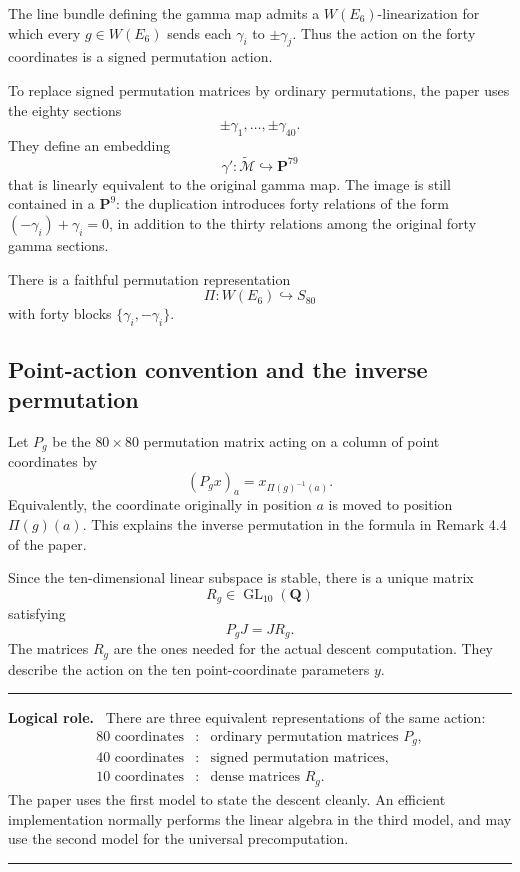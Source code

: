 \documentclass[11pt]{article}
\newcommand{\QQ}{\mathbf{Q}}
\newcommand{\PP}{\mathbf{P}}
\newcommand{\tcM}{\widetilde{\mathcal{M}}}
\newenvironment{roadmap}{%
  \begin{center}\begin{minipage}{0.93\textwidth}\small
  \hrule\vspace{0.55em}\textbf{Logical role.}\ }{%
  \vspace{0.55em}\hrule\end{minipage}\end{center}}
\begin{document}
The line bundle defining the gamma map admits a $W(E_6)$-linearization for
which every $g\in W(E_6)$ sends each $\gamma_i$ to $\pm\gamma_j$.  Thus the
action on the forty coordinates is a signed permutation action.

To replace signed permutation matrices by ordinary permutations, the paper
uses the eighty sections
\[
  \pm\gamma_1,\ldots,\pm\gamma_{40}.
\]
They define an embedding
\[
  \gamma':\tcM\hookrightarrow\PP^{79}
\]
that is linearly equivalent to the original gamma map.  The image is still
contained in a $\PP^9$: the duplication introduces forty relations of the
form $(-\gamma_i)+\gamma_i=0$, in addition to the thirty relations among the
original forty gamma sections.

There is a faithful permutation representation
\[
  \Pi:W(E_6)\hookrightarrow S_{80}
\]
with forty blocks $\{\gamma_i,-\gamma_i\}$.

\subsection{Point-action convention and the inverse permutation}

Let $P_g$ be the $80\times80$ permutation matrix acting on a column of point
coordinates by
\[
  (P_gx)_a=x_{\Pi(g)^{-1}(a)}.
\]
Equivalently, the coordinate originally in position $a$ is moved to position
$\Pi(g)(a)$.  This explains the inverse permutation in the formula in
Remark 4.4 of the paper.

Since the ten-dimensional linear subspace is stable, there is a unique
matrix
\[
  R_g\in\operatorname{GL}_{10}(\QQ)
\]
satisfying
\[
  P_gJ=JR_g.
\]
The matrices $R_g$ are the ones needed for the actual descent computation.
They describe the action on the ten point-coordinate parameters $y$.

\begin{roadmap}
There are three equivalent representations of the same action:
\[
\begin{array}{ccl}
80\text{ coordinates} &:& \text{ordinary permutation matrices }P_g,\\
40\text{ coordinates} &:& \text{signed permutation matrices},\\
10\text{ coordinates} &:& \text{dense matrices }R_g.
\end{array}
\]
The paper uses the first model to state the descent cleanly.  An efficient
implementation normally performs the linear algebra in the third model, and
may use the second model for the universal precomputation.
\end{roadmap}
\end{document}
